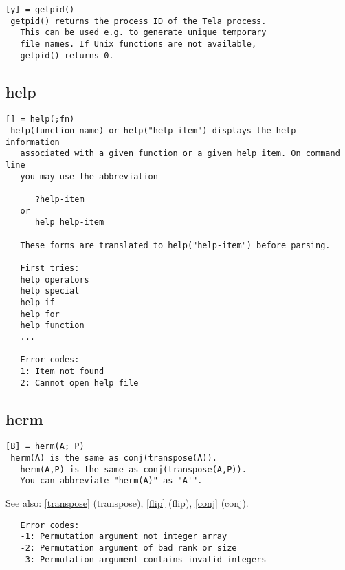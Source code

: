 \documentclass[a4paper]{article}
\begin{document}
\begin{tscreen}
\begin{verbatim}
[y] = getpid()
 getpid() returns the process ID of the Tela process.
   This can be used e.g. to generate unique temporary
   file names. If Unix functions are not available,
   getpid() returns 0. 
\end{verbatim}
\end{tscreen}



\subsection{help\label{help}}

\begin{tscreen}
\begin{verbatim}
[] = help(;fn)
 help(function-name) or help("help-item") displays the help information
   associated with a given function or a given help item. On command line
   you may use the abbreviation

      ?help-item
   or
      help help-item

   These forms are translated to help("help-item") before parsing.

   First tries:
   help operators
   help special
   help if
   help for
   help function
   ...
   
   Error codes:
   1: Item not found
   2: Cannot open help file 
\end{verbatim}
\end{tscreen}



\subsection{herm\label{herm}}

\begin{tscreen}
\begin{verbatim}
[B] = herm(A; P)
 herm(A) is the same as conj(transpose(A)).
   herm(A,P) is the same as conj(transpose(A,P)).
   You can abbreviate "herm(A)" as "A'".
\end{verbatim}

See also: \ref{transpose} {(transpose)}, \ref{flip} {(flip)}, \ref{conj} {(conj)}.
\begin{verbatim}
   Error codes:
   -1: Permutation argument not integer array
   -2: Permutation argument of bad rank or size
   -3: Permutation argument contains invalid integers 
\end{verbatim}
\end{tscreen}
\end{document}
